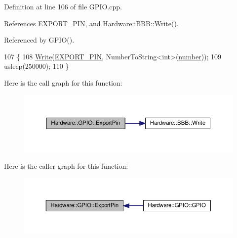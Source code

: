 Definition at line 106 of file G\+P\+I\+O.\+cpp.



References E\+X\+P\+O\+R\+T\+\_\+\+P\+I\+N, and Hardware\+::\+B\+B\+B\+::\+Write().



Referenced by G\+P\+I\+O().


\begin{DoxyCode}
107     \{
108         \hyperlink{class_hardware_1_1_b_b_b_a155cc06f76d82a6b690ce5ea08e7c68e}{Write}(\hyperlink{_g_p_i_o_8h_a76065c2ed428f7d0b15d2cd8e494b857}{EXPORT\_PIN}, NumberToString<int>(\hyperlink{class_hardware_1_1_g_p_i_o_a1671a87bb70911b0a6a29019a068cf96}{number}));
109         usleep(250000);
110     \}
\end{DoxyCode}


Here is the call graph for this function\+:\nopagebreak
\begin{figure}[H]
\begin{center}
\leavevmode
\includegraphics[width=350pt]{class_hardware_1_1_g_p_i_o_a1a880bee633c9c5227cb36d2d6c63a52_cgraph}
\end{center}
\end{figure}




Here is the caller graph for this function\+:\nopagebreak
\begin{figure}[H]
\begin{center}
\leavevmode
\includegraphics[width=350pt]{class_hardware_1_1_g_p_i_o_a1a880bee633c9c5227cb36d2d6c63a52_icgraph}
\end{center}
\end{figure}


\hypertarget{class_hardware_1_1_g_p_i_o_a410f58faf97368fc9a1d76f3b44afbcb}{}
